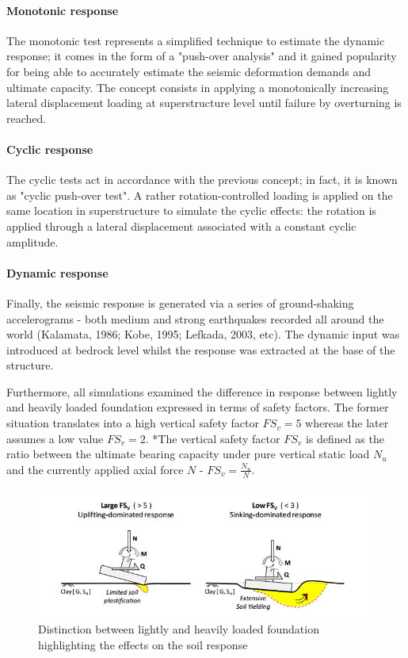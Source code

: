 \documentclass[11pt,a4paper]{report}
\begin{document}
\paragraph{Monotonic response}
The monotonic test represents a simplified technique to estimate the dynamic response; it comes in the form of a "push-over analysis" and it gained popularity for being able to accurately estimate the seismic deformation demands and ultimate capacity. The concept consists in applying a monotonically increasing lateral displacement loading at superstructure level until failure by overturning is reached. 

\paragraph{Cyclic response}
The cyclic tests act in accordance with the previous concept; in fact, it is known as "cyclic push-over test". A rather rotation-controlled loading is applied on the same location in superstructure to simulate the cyclic effects: the rotation is applied through a lateral displacement associated with a constant cyclic amplitude.

\paragraph{Dynamic response}
Finally, the seismic response is generated via a series of ground-shaking accelerograms - both medium and strong earthquakes recorded all around the world (Kalamata, 1986; Kobe, 1995; Lefkada, 2003, etc). The dynamic input was introduced at bedrock level whilst the response was extracted at the base of the structure.

Furthermore, all simulations examined the difference in response between lightly and heavily loaded foundation expressed in terms of safety factors. The former situation translates into a high vertical safety factor $FS_v=5$ whereas the later assumes a low value $FS_v=2$. *The vertical safety factor $FS_v$ is defined as the ratio between the ultimate bearing capacity under pure vertical static load $N_u$ and the currently applied axial force $N$ - $FS_v = \frac{N_u}{N}$. 

\begin{figure}[!h]
	\centering
	\includegraphics[width=0.8\linewidth]{"largeFS"}
	\caption{Distinction between lightly and heavily loaded foundation highlighting the effects on the soil response}
	\label{largeFS}
\end{figure}
\end{document}
